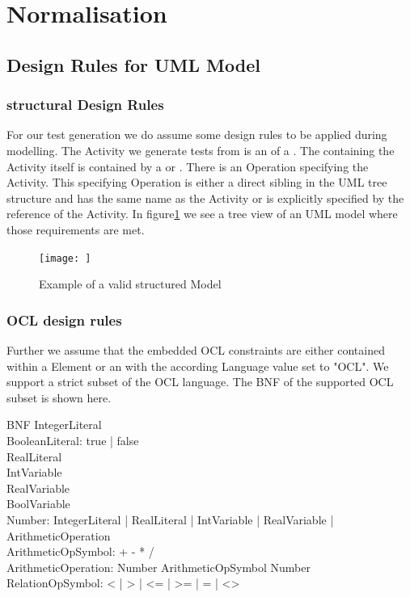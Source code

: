 \section{Normalisation}

\subsection{Design Rules for UML Model} %
\subsubsection{structural Design Rules}
For our test generation we do assume some design rules to be applied during modelling. The Activity we generate tests from is an  of a . The   containing the Activity itself is contained by a  or . 
There is an Operation specifying the Activity. This specifying Operation is either a direct sibling in the UML tree structure and has the same name as the Activity or is explicitly specified by the  reference of the Activity.
In figure\ref{fig:StructureExample} we see a tree view of an UML model where those requirements are met.
\begin{figure}
\label{fig:StructureExample}
\texttt{[image: ]}
\caption{Example of a valid structured Model}
\end{figure}
\subsubsection{OCL design rules}
Further we assume that the embedded OCL constraints are either contained within a  Element or an  with the according Language value set to "OCL". We support a strict subset of the OCL language. The BNF of the supported OCL subset is shown here.

BNF
IntegerLiteral\\
BooleanLiteral: true | false\\
RealLiteral\\
IntVariable\\
RealVariable\\
BoolVariable\\
Number: IntegerLiteral | RealLiteral | IntVariable | RealVariable | ArithmeticOperation\\
ArithmeticOpSymbol: + - * /\\
ArithmeticOperation: Number ArithmeticOpSymbol Number \\
RelationOpSymbol: < | > | <= | >= | = | <> 

